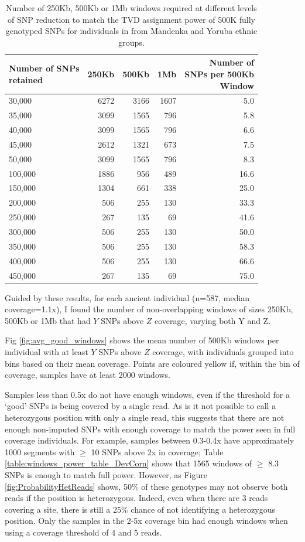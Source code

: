 \begin{table}
\centering
\begin{tabular}[t]{lrrrr}
\toprule
\thead{Number of SNPs\\ retained} & 250Kb & 500Kb & 1Mb & \thead{Number of\\ SNPs per 500Kb \\Window}\\
\midrule
30,000 & 6272 & 3166 & 1607 & 5.0\\
35,000 & 3099 & 1565 & 796 & 5.8\\
40,000 & 3099 & 1565 & 796 & 6.6\\
45,000 & 2612 & 1321 & 673 & 7.5\\
50,000 & 3099 & 1565 & 796 & 8.3\\
100,000 & 1886 & 956 & 489 & 16.6\\
150,000 & 1304 & 661 & 338 & 25.0\\
200,000 & 506 & 255 & 130 & 33.3\\
250,000 & 267 & 135 & 69 & 41.6\\
300,000 & 506 & 255 & 130 & 50.0\\
350,000 & 506 & 255 & 130 & 58.3\\
400,000 & 506 & 255 & 130 & 66.6\\
450,000 & 267 & 135 & 69 & 75.0\\
\bottomrule
\end{tabular}
\caption{Number of 250Kb, 500Kb or 1Mb windows required at different levels of SNP reduction to match the TVD assignment power of 500K fully genotyped SNPs for individuals in from Mandenka and Yoruba ethnic groups.}
\label{table:windows_power_table_ManYor}
\end{table}

Guided by these results, for each ancient individual (n=587, median coverage=1.1x), I found the number of non-overlapping windows of sizes 250Kb, 500Kb or 1Mb that had $Y$ SNPs above $Z$ coverage, varying both Y and Z. 

Fig \ref{fig:avg_good_windows} shows the mean number of 500Kb windows per individual with at least $Y$ SNPs above $Z$ coverage, with individuals grouped into bins based on their mean coverage. Points are coloured yellow if, within the bin of coverage, samples have at least 2000 windows.

Samples less than 0.5x do not have enough windows, even if the threshold for a `good' SNPs is being covered by a single read. As is it not possible to call a heterozygous position with only a single read, this suggests that there are not enough non-imputed SNPs with enough coverage to match the power seen in full coverage individuals. For example, samples between 0.3-0.4x have approximately 1000 segments with $\geq$ 10 SNPs above 2x in coverage; Table \ref{table:windows_power_table_DevCorn} shows that 1565 windows of $\geq$ 8.3 SNPs is enough to match full power. However, as Figure \ref{fig:ProbabilityHetReads} shows, 50\% of these genotypes may not observe both reads if the position is heterozygous. Indeed, even when there are 3 reads covering a site, there is still a 25\% chance of not identifying a heterozygous position. Only the samples in the 2-5x coverage bin had enough windows when using a coverage threshold of 4 and 5 reads. 


